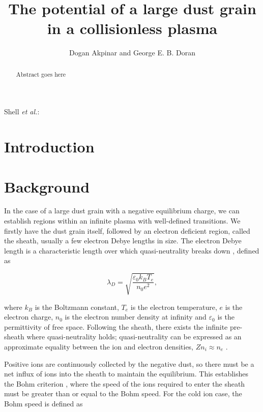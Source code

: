 \documentclass{article}
\begin{document}
\title{The potential of a large dust grain in a collisionless plasma}
\author{Dogan Akpinar and George E. B. Doran}
{Shell \MakeLowercase{\textit{et al.}}:}

\maketitle

\begin{abstract}
Abstract goes here
\end{abstract}

\section{Introduction}

\section{Background}

In the case of a large dust grain with a negative equilibrium charge, we can establish regions within an infinite plasma with well-defined
transitions. We firstly have the dust grain itself, followed
by an electron deficient region, called the sheath, usually a few electron Debye lengths
in size. The electron Debye length is a characteristic length over which quasi-neutrality breaks down \cite{DebyeLength} \cite{IntroToPlasmas}, 
defined as

\begin{equation}\label{eq:Debye}
\lambda_D = \sqrt{\frac{\varepsilon_{0} k_{B} T_{e}}{n_{0} e^2}},
\end{equation}

\medskip

\noindent where $k_B$ is the Boltzmann constant, $T_e$ is the electron temperature, $e$ is the 
electron charge, $n_0$ is the electron number density at infinity and $\varepsilon_{0}$ is the
permittivity of free space. Following the sheath, there exists the infinite pre-sheath where quasi-neutrality holds;
quasi-neutrality can be expressed as an approximate equality between the ion and electron
densities, $Zn_i \approx n_e$ \cite{IntroToPlasmas}.

\medskip

Positive ions are continuously collected by the negative dust, so there must be
a net influx of ions into the sheath to maintain the equilibrium. This establishes the Bohm
criterion \cite{Bohm}, where the speed of the ions required to enter the sheath must be 
greater than or equal to the Bohm speed. For the cold ion case, the Bohm speed is defined as
\end{document}
